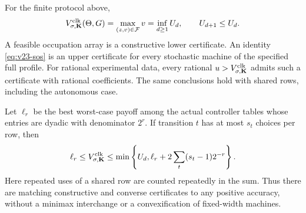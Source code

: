 \begin{theorem}
\label{thm:v23-dual}
For the finite protocol above,
\begin{equation}\label{eq:v23-complete-dual}
 V^{\rm clk}_{\sigma,\mathbf K}(\Theta,G)
 =\max_{(z,v)\in\mathcal F}v=\inf_{d\ge1}U_d,
 \qquad U_{d+1}\le U_d.
\end{equation}
A feasible occupation array is a constructive lower certificate. An
identity \eqref{eq:v23-sos} is an upper certificate for every stochastic
machine of the specified full profile. For rational experimental data,
every rational $u>V^{\rm clk}_{\sigma,\mathbf K}$ admits such a
certificate with rational coefficients. The same conclusions hold with
shared rows, including the autonomous case.

Let $\ell_r$ be the best worst-case payoff among the actual controller
tables whose entries are dyadic with denominator $2^r$. If transition
$t$ has at most $s_t$ choices per row, then
\begin{equation}\label{eq:v23-two-sided}
 \ell_r\le V^{\rm clk}_{\sigma,\mathbf K}
 \le \min\left\{U_d,\ell_r+
                2\sum_t(s_t-1)2^{-r}\right\}.
\end{equation}
Here repeated uses of a shared row are counted repeatedly in the sum.
Thus there are matching constructive and converse certificates to any
positive accuracy, without a minimax interchange or a convexification
of fixed-width machines.
\end{theorem}
